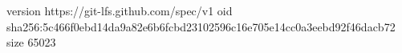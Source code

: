 version https://git-lfs.github.com/spec/v1
oid sha256:5c466f0ebd14da9a82e6b6fcbd23102596c16e705e14cc0a3eebd92f46dacb72
size 65023
